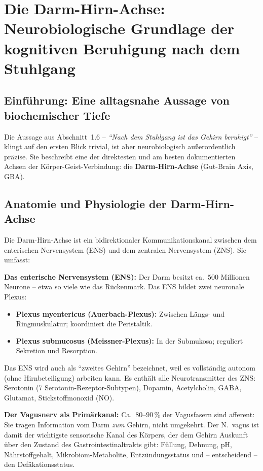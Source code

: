 ﻿\documentclass[12pt,a4paper]{report}
\theoremstyle{plain}
\theoremstyle{definition}
\theoremstyle{remark}
\begin{document}
	\section{Die Darm-Hirn-Achse: Neurobiologische Grundlage der kognitiven Beruhigung nach dem Stuhlgang}

	\subsection{Einführung: Eine alltagsnahe Aussage von biochemischer Tiefe}

	Die Aussage aus Abschnitt~1.6 -- \emph{``Nach dem Stuhlgang ist das
	Gehirn beruhigt''} -- klingt auf den ersten Blick trivial,
	ist aber neurobiologisch außerordentlich präzise.
	Sie beschreibt eine der direktesten und am besten dokumentierten
	Achsen der Körper-Geist-Verbindung: die \textbf{Darm-Hirn-Achse}
	(Gut-Brain Axis, GBA).

	\subsection{Anatomie und Physiologie der Darm-Hirn-Achse}

	Die Darm-Hirn-Achse ist ein bidirektionaler Kommunikationskanal
	zwischen dem enterischen Nervensystem (ENS) und dem zentralen
	Nervensystem (ZNS). Sie umfasst:

	\textbf{Das enterische Nervensystem (ENS):}
	Der Darm besitzt ca.\ $500$ Millionen Neurone --
	etwa so viele wie das Rückenmark. Das ENS bildet zwei
	neuronale Plexus:
	\begin{itemize}
		\item \textbf{Plexus myentericus (Auerbach-Plexus):}
		Zwischen Längs- und Ringmuskulatur; koordiniert die
		Peristaltik.
		\item \textbf{Plexus submucosus (Meissner-Plexus):}
		In der Submukosa; reguliert Sekretion und Resorption.
	\end{itemize}
	Das ENS wird auch als ``zweites Gehirn'' bezeichnet,
	weil es vollständig autonom (ohne Hirnbeteiligung) arbeiten kann.
	Es enthält alle Neurotransmitter des ZNS:
	Serotonin (7 Serotonin-Rezeptor-Subtypen),
	Dopamin, Acetylcholin, GABA, Glutamat, Stickstoffmonoxid (NO).

	\textbf{Der Vagusnerv als Primärkanal:}
	Ca.\ $80$--$90\,\%$ der Vagusfasern sind afferent:
	Sie tragen Information vom Darm \emph{zum} Gehirn,
	nicht umgekehrt. Der N.\ vagus ist damit der wichtigste
	sensorische Kanal des Körpers, der dem Gehirn Auskunft
	über den Zustand des Gastrointestinaltrakts gibt:
	Füllung, Dehnung, pH, Nährstoffgehalt, Mikrobiom-Metabolite,
	Entzündungsstatus und -- entscheidend -- den Defäkationsstatus.
\end{document}

